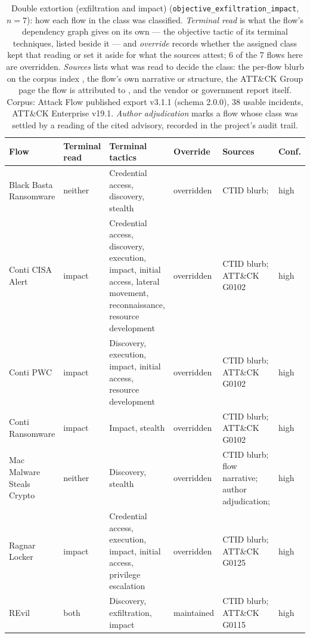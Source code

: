 \begin{table}[htbp]
\centering
\scriptsize
\setlength{\tabcolsep}{4pt}
\caption[Double extortion (exfiltration and impact): per-flow classification]{Double extortion (exfiltration and impact) (\texttt{objective\_exfiltration\_impact}, $n=7$): how each flow in the class was classified. \emph{Terminal read} is what the flow's dependency graph gives on its own --- the objective tactic of its terminal techniques, listed beside it --- and \emph{override} records whether the assigned class kept that reading or set it aside for what the sources attest; 6 of the 7 flows here are overridden. \emph{Sources} lists what was read to decide the class: the per-flow blurb on the corpus index \citep{ctid2025attackflow}, the flow's own narrative or structure, the ATT\&CK Group page the flow is attributed to \citep{mitre2026attackv19}, and the vendor or government report itself. Corpus: Attack Flow published export v3.1.1 (schema 2.0.0), 38 usable incidents, ATT\&CK Enterprise v19.1. \emph{Author adjudication} marks a flow whose class was settled by a reading of the cited advisory, recorded in the project's audit trail.}
\label{tab:objective-audit-exfiltration-impact}
\begin{tabular}{@{}A{0.175\textwidth}A{0.100\textwidth}A{0.245\textwidth}A{0.100\textwidth}A{0.225\textwidth}A{0.045\textwidth}@{}}
\toprule
Flow & Terminal read & Terminal tactics & Override & Sources & Conf. \\
\midrule
Black Basta Ransomware & neither & Credential access, discovery, stealth & overridden & CTID blurb; \citep{unit42basta2022} & high \\
Conti CISA Alert & impact & Credential access, discovery, execution, impact, initial access, lateral movement, reconnaissance, resource development & overridden & CTID blurb; ATT\&CK G0102 & high \\
Conti PWC & impact & Discovery, execution, impact, initial access, resource development & overridden & CTID blurb; ATT\&CK G0102 & high \\
Conti Ransomware & impact & Impact, stealth & overridden & CTID blurb; ATT\&CK G0102 & high \\
Mac Malware Steals Crypto & neither & Discovery, stealth & overridden & CTID blurb; flow narrative; author adjudication; \citep{unit42maccookies2019} & high \\
Ragnar Locker & impact & Credential access, execution, impact, initial access, privilege escalation & overridden & CTID blurb; ATT\&CK G0125 & high \\
REvil & both & Discovery, exfiltration, impact & maintained & CTID blurb; ATT\&CK G0115 & high \\
\bottomrule
\end{tabular}
\end{table}

